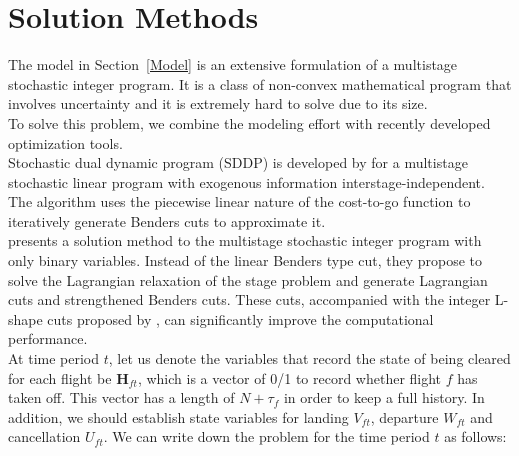 \documentclass[12pt]{article}
\begin{document}
\section{Solution Methods}
	The model in Section~\ref{Model} is an extensive formulation of a multistage stochastic integer program. It is a class of non-convex mathematical program that involves uncertainty and it is extremely hard to solve due to its size. \\
	\newline
	To solve this problem, we combine the modeling effort with recently developed optimization tools.\\
	\newline Stochastic dual dynamic program (SDDP) is developed by \cite{pereira1991multi} for a multistage stochastic linear program with exogenous information interstage-independent. The algorithm uses the piecewise linear nature of the cost-to-go function to iteratively generate Benders cuts to approximate it.\\
	\newline \cite{zou2016nested} presents a solution method to the multistage stochastic integer program with only binary variables. Instead of the linear Benders type cut, they propose to solve the Lagrangian relaxation of the stage problem and generate Lagrangian cuts and strengthened Benders cuts. These cuts, accompanied with the integer L-shape cuts proposed by \cite{laporte1993integer}, can significantly improve the computational performance.\\
	\newline At time period \(t\), let us denote the variables that record the state of being cleared for each flight be \(\mathbf{H}_{ft}\), which is a vector of 0/1 to record whether flight \(f\) has taken off. This vector has a length of \(N + \tau_f\) in order to keep a full history. In addition, we should establish state variables for landing \(V_{ft}\), departure \(W_{ft}\) and cancellation \(U_{ft}\). We can write down the problem for the time period \(t\) as follows:
\end{document}
